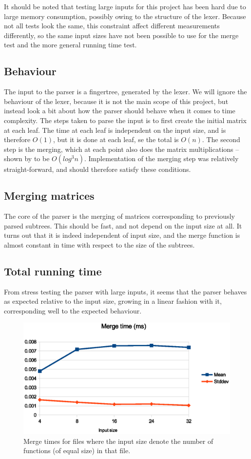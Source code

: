 \documentclass[a4paper,12pt,twosided]{report}
\begin{document}
It should be noted that testing large inputs for this project has been hard due
to large memory consumption, possibly owing to the structure of the lexer.
Because not all tests look the same, this constraint affect different
measurements differently, so the same input sizes have not been possible to use
for the merge test and the more general running time test.

\subsection{Behaviour}
The input to the parser is a fingertree, generated by the lexer. We will ignore
the behaviour of the lexer, because it is not the main scope of this project, but
instead look a bit about how the parser should behave when it comes to time
complexity. The steps taken to parse the input is to first create the initial
matrix at each leaf. The time at each leaf is independent on the input size, and
is therefore $O(1)$, but it is done at each leaf, se the total is $O(n)$. The
second step is the merging, which at each point also does the matrix
multiplications -- shown by \citet{parparsepaper} to be $O(log^3 n)$.
Implementation of the merging step was relatively straight-forward, and should
therefore satisfy these conditions. 

\subsection{Merging matrices}
The core of the parser is the merging of matrices corresponding to previously
parsed subtrees. This should be fast, and not depend on the input size at all.
It turns out that it is indeed independent of input size, and the merge function
is almost constant in time with respect to the size of the subtrees.

\subsection{Total running time}
From stress testing the parser with large inputs, it seems that the parser
behaves as expected relative to the input size, growing in a linear fashion with
it, corresponding well to the expected behaviour.

\begin{figure}[H]
\includegraphics[width=\textwidth]{criterion-merge.eps}
\caption{\label{critmerge}Merge times for files where the input size denote the
number of functions (of equal size) in that file.}
\end{figure}
\end{document}
